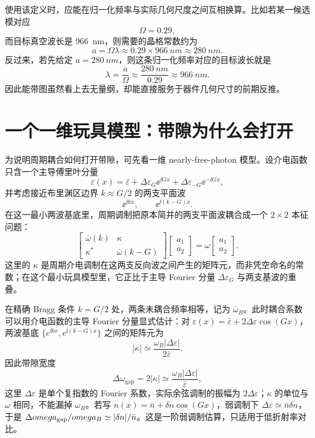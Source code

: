 使用该定义时，应能在归一化频率与实际几何尺度之间互相换算。比如若某一候选模对应
\[
\Omega = 0.29,
\]
而目标真空波长是 \SI{966}{nm}，则需要的晶格常数约为
\[
a = \Omega \lambda \approx 0.29\times \SI{966}{nm}\approx \SI{280}{nm}.
\]
反过来，若先给定 $a=\SI{280}{nm}$，则这条归一化频率对应的目标波长就是
\[
\lambda = \frac{a}{\Omega}\approx \frac{\SI{280}{nm}}{0.29}\approx \SI{966}{nm}.
\]
因此能带图虽然看上去无量纲，却能直接服务于器件几何尺寸的前期反推。

\section{一个一维玩具模型：带隙为什么会打开}
为说明周期耦合如何打开带隙，可先看一维 nearly-free-photon 模型。设介电函数只含一个主导傅里叶分量
\[
\varepsilon(x)=\bar{\varepsilon}+\Delta\varepsilon_G \ee^{\ii Gx}+\Delta\varepsilon_{-G}\ee^{-\ii Gx},
\]
并考虑接近布里渊区边界 $k\approx G/2$ 的两支平面波
\[
\ee^{\ii kx},\qquad \ee^{\ii(k-G)x}.
\]
在这一最小两波基底里，周期调制把原本简并的两支平面波耦合成一个 $2\times 2$ 本征问题：
\begin{equation}
\begin{bmatrix}
\bar{\omega}(k) & \kappa \\
\kappa^\ast & \bar{\omega}(k-G)
\end{bmatrix}
\begin{bmatrix}
a_1\\ a_2
\end{bmatrix}
=
\omega
\begin{bmatrix}
a_1\\ a_2
\end{bmatrix}.
\label{eq:1d_nearly_free_photon}
\end{equation}
这里的 $\kappa$ 是周期介电调制在这两支反向波之间产生的矩阵元，而非凭空命名的常数；在这个最小玩具模型里，它正比于主导 Fourier 分量 $\Delta\varepsilon_G$ 与两支基波的重叠。

在精确 Bragg 条件 $k=G/2$ 处，两条未耦合频率相等，记为 $\bar{\omega}_B$。此时耦合系数可以用介电函数的主导 Fourier 分量显式估计：对 $\varepsilon(x)=\bar\varepsilon+2\Delta\varepsilon\cos(Gx)$，两波基底 $\{e^{\ii kx},e^{\ii(k-G)x}\}$ 之间的矩阵元为
\[
|\kappa| \simeq \frac{\omega_B|\Delta\varepsilon|}{2\bar\varepsilon}.
\]
因此带隙宽度
\[
\Delta\omega_{\mathrm{gap}} = 2|\kappa| \simeq \frac{\omega_B|\Delta\varepsilon|}{\bar\varepsilon},
\]
这里 $\Delta\varepsilon$ 是单个复指数的 Fourier 系数，实际余弦调制的振幅为 $2\Delta\varepsilon$；$\kappa$ 的单位与 $\omega$ 相同，不能漏掉 $\omega_B$。若写 $n(x)=\bar n+\delta n\cos(Gx)$，弱调制下 $\Delta\varepsilon\simeq\bar n\delta n$，于是 $\Delta\omega_{\rm gap}/\omega_B\simeq|\delta n|/\bar n$。这是一阶弱调制估算，只适用于低折射率对比。

